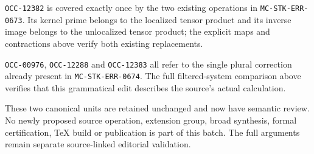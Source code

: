 \texttt{OCC-12382} is covered exactly once by the two existing operations in \texttt{MC-STK-ERR-0673}. Its kernel prime belongs to the localized tensor product and its inverse image belongs to the unlocalized tensor product; the explicit maps and contractions above verify both existing replacements.

\texttt{OCC-00976}, \texttt{OCC-12288} and \texttt{OCC-12383} all refer to the single plural correction already present in \texttt{MC-STK-ERR-0674}. The full filtered-system comparison above verifies that this grammatical edit describes the source's actual calculation.

These two canonical units are retained unchanged and now have semantic review. No newly proposed source operation, extension group, broad synthesis, formal certification, TeX build or publication is part of this batch. The full arguments remain separate source-linked editorial validation.
